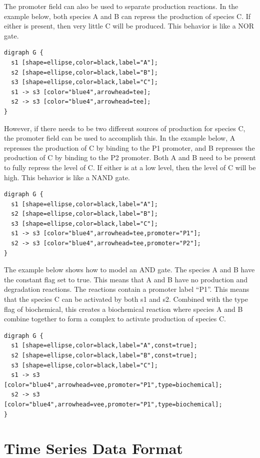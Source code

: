 \documentclass[titlepage,11pt]{article}
\begin{document}
The promoter field can also be used to separate production
reactions. In the example below, both species A and B can repress
the production of species C. If either is present, then very
little C will be produced. This behavior is like a NOR gate. 

\begin{verbatim}
digraph G {
  s1 [shape=ellipse,color=black,label="A"];
  s2 [shape=ellipse,color=black,label="B"];
  s3 [shape=ellipse,color=black,label="C"];
  s1 -> s3 [color="blue4",arrowhead=tee];
  s2 -> s3 [color="blue4",arrowhead=tee];
} 
\end{verbatim}

However, if there needs to be two different sources of
production for species C, the promoter field can be used to
accomplish this. In the example below, A represses the production
of C by binding to the P1 promoter, and B represses the
production of C by binding to the P2 promoter. Both A and B need
to be present to fully repress the level of C. If either is at a
low level, then the level of C will be high. This behavior is
like a NAND gate. 

\begin{verbatim}
digraph G {
  s1 [shape=ellipse,color=black,label="A"];
  s2 [shape=ellipse,color=black,label="B"];
  s3 [shape=ellipse,color=black,label="C"];
  s1 -> s3 [color="blue4",arrowhead=tee,promoter="P1"];
  s2 -> s3 [color="blue4",arrowhead=tee,promoter="P2"];
}
\end{verbatim}

The example below shows how to model an AND gate. The species
A and B have the constant flag set to true. This means that A and
B have no production and degradation reactions. The reactions
contain a promoter label ``P1''. This means that the
species C can be activated by both s1 and s2. Combined with the
type flag of biochemical, this creates a biochemical reaction
where species A and B combine together to form a complex to
activate production of species C. 

\begin{verbatim}
digraph G {
  s1 [shape=ellipse,color=black,label="A",const=true];
  s2 [shape=ellipse,color=black,label="B",const=true];
  s3 [shape=ellipse,color=black,label="C"];
  s1 -> s3 [color="blue4",arrowhead=vee,promoter="P1",type=biochemical];
  s2 -> s3 [color="blue4",arrowhead=vee,promoter="P1",type=biochemical];
}
\end{verbatim}

\section{\label{TSD}Time Series Data Format}
\end{document}
